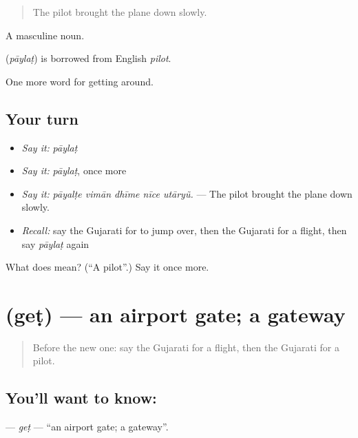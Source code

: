 \begin{quote}
The pilot brought the plane down slowly.
\end{quote}

A masculine noun.

\begin{cousinweb}
\textbf{} (\emph{pāylaṭ}) is borrowed from English \emph{pilot}.
\end{cousinweb}

\begin{grammarlens}[title={What you've built}]
One more word for getting around.
\end{grammarlens}

\subsection*{Your turn}
\begin{itemize}
\raggedright
  \item \emph{Say it:} \emph{pāylaṭ}
  \item \emph{Say it:} \emph{pāylaṭ}, once more
  \item \emph{Say it:} \emph{pāyalṭe vimān dhīme nīce utāryũ.} — The pilot brought the plane down slowly.
  \item \emph{Recall:} say the Gujarati for to jump over, then the Gujarati for a flight, then say \emph{pāylaṭ} again
\end{itemize}

\begin{tcolorbox}[breakable,colback=teal!4,colframe=teal!35!black,title={Before you move on}]
What does  mean? (\textquotedblleft{}A pilot\textquotedblright{}.) Say it once more.
\end{tcolorbox}
\section[\texorpdfstring{\gu{ગેટ} (geṭ)}{ગેટ (geṭ)}]{ (geṭ) — an airport gate; a gateway}

\label{lesson:GU-C405-get}



\begin{quote}
Before the new one: say the Gujarati for a flight, then the Gujarati for a pilot.
\end{quote}

\subsection*{You'll want to know: }
\textbf{} — \emph{geṭ} — \textquotedblleft{}an airport gate; a gateway\textquotedblright{}.

